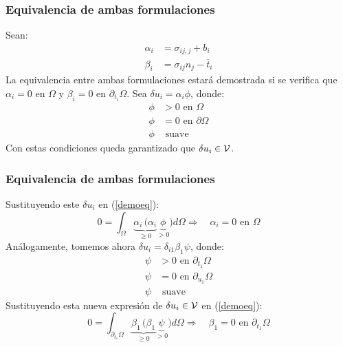 \documentclass[10pt, aspectratio=43]{beamer}
\begin{document}
\begin{frame}
\frametitle{Equivalencia de ambas formulaciones}
Sean:
\begin{align}
\alpha_i&=\sigma_{ij,j}+b_i \\
\beta_i&=\sigma_{ij}n_j-\overline{t}_i
\end{align}
La equivalencia entre ambas formulaciones estará demostrada si se verifica
que $\alpha_i=0$ en $\Omega$ y $\beta_i=0$ en $\partial_{t_i} \Omega$.
Sea $\delta u_i=\alpha_i \phi$, donde:
\begin{align*}
\phi&>0 \textrm{ en } \Omega \\
\phi&=0 \textrm{ en } \partial \Omega \\
\phi& \textrm{ suave}
\end{align*}
Con estas condiciones queda garantizado que $\delta u_i \in {\cal V}$.
\end{frame}
\begin{frame}
\frametitle{Equivalencia de ambas formulaciones}
Sustituyendo este $\delta u_i$ en (\ref{demoeq}):
\begin{equation}
0=\int_{\Omega} \underbrace{\alpha_i \, (\alpha_i}_{\geq 0}
\underbrace{ \phi}_{>0}) d\Omega 
\Rightarrow \quad \alpha_i=0 \textrm{ en } \Omega
\end{equation}
Análogamente, tomemos ahora $\delta u_i=\delta_{i1} \beta_1 \psi$, donde:
\begin{align*}
\psi&>0 \textrm{ en } \partial_{t_1}\Omega \\
\psi&=0 \textrm{ en } \partial_{u_1} \Omega \\
\psi& \textrm{ suave}
\end{align*}
Sustituyendo esta nueva expresión de $\delta u_i \in {\cal V}$ en
(\ref{demoeq}):
\begin{equation}
0=\int_{\partial_{t_1} \Omega} \underbrace{\beta_1 \, (\beta_1}_{\geq 0}
\underbrace{ \psi}_{>0}) d\Omega 
\Rightarrow \quad \beta_1=0 \textrm{ en } \partial_{t_1} \Omega
\end{equation}
\end{frame}
\end{document}
